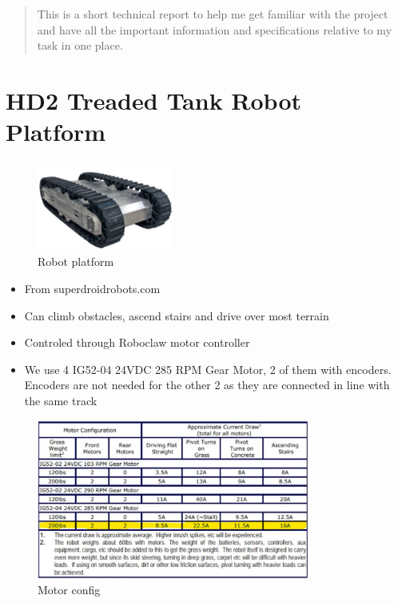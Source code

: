 \documentclass[12pt,letterpaper,oneside]{article}
\begin{document}
\makeCustomTitle
\thispagestyle{titlePage}

\begin{abstract}
This is a short technical report to help me get familiar with the project and have all the important information and specifications relative to my task in one place.
\end{abstract}

\section{HD2 Treaded Tank Robot Platform}

\begin{figure}[h]
    \centering
    \includegraphics[width=0.4\textwidth]{./figures/platform.jpg}
    \caption{Robot platform}
    \label{fig:my_label}
\end{figure}

\begin{itemize}
    \item From superdroidrobots.com
    \item Can climb obstacles, ascend stairs and drive over most terrain
    \item Controled through Roboclaw motor controller
    \item We use 4 IG52-04 24VDC 285 RPM Gear Motor, 2 of them with encoders. Encoders are not needed for the other 2 as they are connected in line with the same track
\end{itemize}

\begin{figure}[h]
    \centering
    \includegraphics[width=0.8\textwidth]{figures/motorSpecs.jpg}
    \caption{Motor config}
    \label{fig:my_label}
\end{figure}
\end{document}

